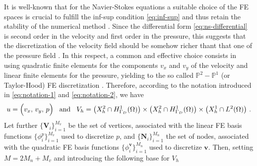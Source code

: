 \documentclass[12pt, a4paper, twoside, openright]{report}
\numberwithin{equation}{chapter}
\theoremstyle{theorem}
\theoremstyle{definition}
\theoremstyle{remark}
\theoremstyle{proposition}
\numberwithin{figure}{chapter}
\newcommand{\bg}[1]{\boldsymbol{#1}}
\begin{document}
		It is well-known that for the Navier-Stokes equations a suitable choice of the FE spaces is crucial to fulfill the inf-sup condition \eqref{eq:inf-sup} and thus retain the stability of the numerical method \cite{Ran99}. Since the differential form \eqref{eq:ns-differential} is second order in the velocity and first order in the pressure, this suggests that the discretization of the velocity field should be somehow richer thant that one of the pressure field \cite{Qua10}. In this respect, a common and effective choice consists in using quadratic finite elements for the components $v_x$ and $v_y$ of the velocity and linear finite elements for the pressure, yielding to the so called $\mathbb{P}^2 - \mathbb{P}^1$ (or Taylor-Hood) FE discretization \cite{Per02}. Therefore, according to the notation introduced in \eqref{eq:notation-1} and \eqref{eq:notation-2}, we have
		\begin{equation}
			\begin{aligned}
				u = \Big( v_x, \, v_y, \, p \Big) \hspace*{0.3cm} \text{and} \hspace*{0.3cm} V_h = \left( X_h^2 \cap H^1_{\Gamma_D}(\Omega) \right) \times \left( X_h^2 \cap H^1_{\Gamma_D}(\Omega) \right) \times \left( X_h^1 \cap L^2(\Omega) \right) \, .
			\end{aligned}
		\end{equation}
		Let further $\big\lbrace \bg{V}_i \big\rbrace_{i = 1}^{M_v}$ be the set of vertices, associated with the linear FE basis functions $\big\lbrace \phi_i^p \big\rbrace_{i = 1}^{M_v}$ used to discretize $p$, and $\big\lbrace \bg{N}_i \big\rbrace_{i = 1}^{M_n}$ the set of nodes, associated with the quadratic FE basis functions $\big\lbrace \phi_i^{\bg{v}} \big\rbrace_{i = 1}^{M_n}$ used to discretize $\bg{v}$. Then, setting $M = 2 M_n +M_v$ and introducing the following base for $V_h$
\end{document}
